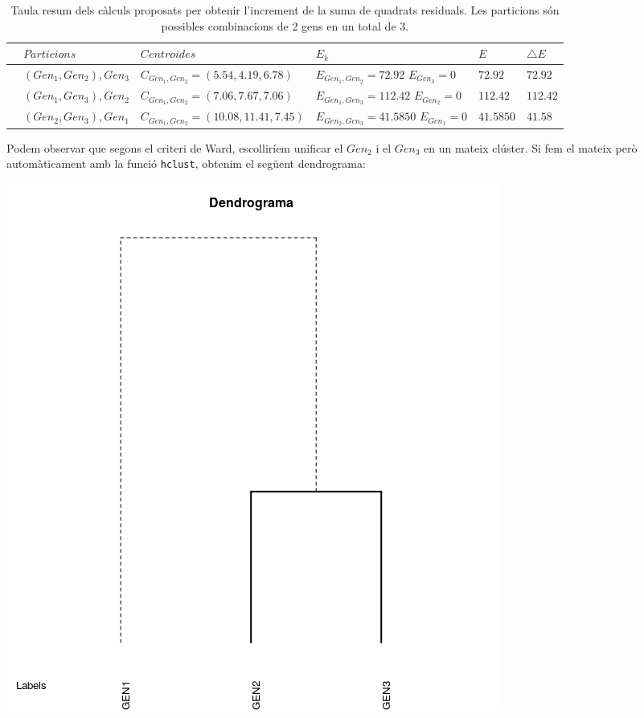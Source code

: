 \documentclass[english]{article}
\begin{document}
\begin{table}[ht]
\onecolumn
\centering
\begin{tabularx}{\linewidth}{llllll}
\hline
& $Particions$ & $Centroides$ & $E_k$ & $E$ & $\bigtriangleup E$ \\
\hline
& $(Gen_1,Gen_2),Gen_3$ & $C_{Gen_1,Gen_2} = (5.54,4.19,6.78) $ & $E_{Gen_1,Gen_2}=72.92$
$E_{Gen_3}=0$ & $72.92$ & $72.92$ \\
& $(Gen_1,Gen_3),Gen_2$ & $C_{Gen_1,Gen_2} = (7.06,7.67,7.06) $ & $E_{Gen_1,Gen_3}=112.42$
$E_{Gen_2}=0$ & $112.42$ & $112.42$ \\
& $(Gen_2,Gen_3),Gen_1$ & $C_{Gen_1,Gen_2} = (10.08,11.41,7.45)$ & $E_{Gen_2,Gen_3}=41.5850$
$E_{Gen_1}=0$ & $41.5850$ & $41.58$ \\
\hline
\end{tabularx}
\caption{Taula resum dels càlculs proposats per obtenir l'increment de la suma de quadrats residuals. Les particions són possibles combinacions de 2 gens en un total de 3.}
\end{table}

\noindent Podem observar que segons el criteri de Ward, escolliríem unificar el $Gen_2$ i el $Gen_3$ en un mateix clúster. Si fem el mateix però automàticament amb la funció \texttt{hclust}, obtenim el següent dendrograma:
\begin{center}
\includegraphics[scale=0.4]{dendrograma.png}
\end{center}
\end{document}
